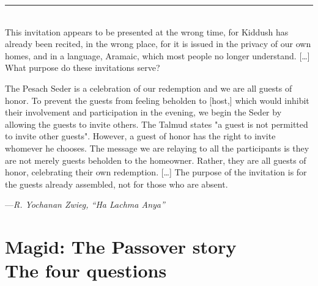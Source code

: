 \documentclass[letter,11pt,openany]{memoir}
\newcommand{\HgSource}[1]{\hfill{\small---\itshape{#1}}}
\newcommand{\HgFill}{
\vfill \hrule 
\vfill}
\newenvironment{HgEnglish}{\strut\\
\noindent}{\vspace{1em}}
\begin{document}
\HgFill
\begin{HgEnglish}
	This invitation appears to be presented at the wrong time, for Kiddush has already been recited, in the wrong place, for it is issued in the privacy of our own homes, and in a language, Aramaic, which most people no longer understand. [\ldots] What purpose do these invitations serve?
	
	The Pesach Seder is a celebration of our redemption and we are all guests of honor. To prevent the guests from feeling beholden to [host,] which would inhibit their involvement and participation in the evening, we begin the Seder by allowing the guests to invite others. The Talmud states "a guest is not permitted to invite other guests". However, a guest of honor has the right to invite whomever he chooses. The message we are relaying to all the participants is they are not merely guests beholden to the homeowner. Rather, they are all guests of honor, celebrating their own redemption. [\ldots] The purpose of the invitation is for the guests already assembled, not for those who are absent.
	
	\HgSource{R. Yochanan Zwieg, ``Ha Lachma Anya''} 
\end{HgEnglish}

\chapter*{Magid: The Passover story \\
{\LARGE The four questions}}

\vfill
\end{document}
